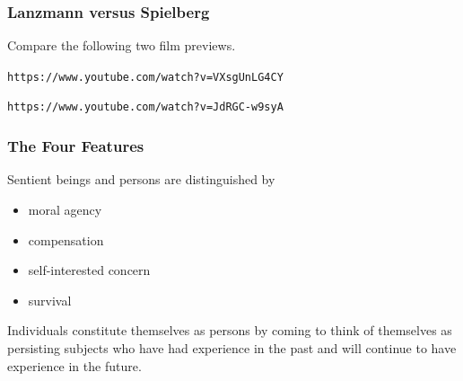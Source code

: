 \documentclass[xcolor=dvipsnames]{beamer}
\begin{document}

\begin{frame}
  \frametitle{Lanzmann versus Spielberg}
  Compare the following two film previews.
  \begin{alltt}
    https://www.youtube.com/watch?v=VXsgUnLG4CY
  \end{alltt}
  \begin{alltt}
    https://www.youtube.com/watch?v=JdRGC-w9syA
  \end{alltt}
\end{frame}

\begin{frame}
  \frametitle{The Four Features}
  Sentient beings and persons are distinguished by
  \begin{itemize}
  \item moral agency
  \item compensation
  \item self-interested concern
  \item survival
  \end{itemize}
  Individuals constitute themselves as persons by coming to think of
  themselves as persisting subjects who have had experience in the
  past and will continue to have experience in the future.
\end{frame}
\end{document}
